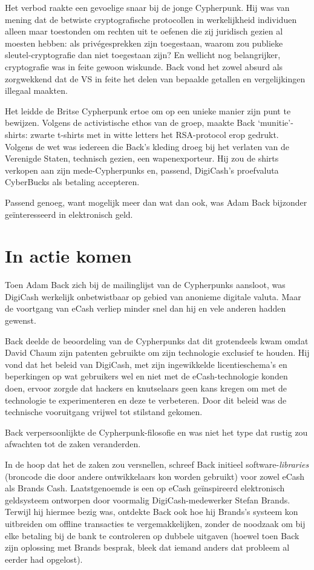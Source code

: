 \documentclass[smalldemyvopaper,11pt,twoside,onecolumn,openright,extrafontsizes,hidelinks]{memoir}
\begin{document}
Het verbod raakte een gevoelige snaar bij de jonge Cypherpunk. Hij was
van mening dat de betwiste cryptografische protocollen in werkelijkheid
individuen alleen maar toestonden om rechten uit te oefenen die zij
juridisch gezien al moesten hebben: als privégesprekken zijn toegestaan,
waarom zou publieke sleutel-cryptografie dan niet toegestaan zijn? En
wellicht nog belangrijker, cryptografie was in feite gewoon wiskunde.
Back vond het zowel absurd als zorgwekkend dat de VS in feite het delen
van bepaalde getallen en vergelijkingen illegaal maakten.

Het leidde de Britse Cypherpunk ertoe om op een unieke manier zijn punt
te bewijzen. Volgens de activistische ethos van de groep, maakte Back
`munitie'-shirts: zwarte t-shirts met in witte letters het RSA-protocol
erop gedrukt. Volgens de wet was iedereen die Back's kleding droeg bij
het verlaten van de Verenigde Staten, technisch gezien, een
wapenexporteur. Hij zou de shirts verkopen aan zijn mede-Cypherpunks en,
passend, DigiCash's proefvaluta CyberBucks als betaling accepteren.

Passend genoeg, want mogelijk meer dan wat dan ook, was Adam Back
bijzonder geïnteresseerd in elektronisch geld.

\section{In actie komen}\label{in-actie-komen}

Toen Adam Back zich bij de mailinglijst van de Cypherpunks aansloot, was
DigiCash werkelijk onbetwistbaar op gebied van anonieme digitale valuta.
Maar de voortgang van eCash verliep minder snel dan hij en vele anderen
hadden gewenst.

Back deelde de beoordeling van de Cypherpunks dat dit grotendeels kwam
omdat David Chaum zijn patenten gebruikte om zijn technologie exclusief
te houden. Hij vond dat het beleid van DigiCash, met zijn ingewikkelde
licentieschema's en beperkingen op wat gebruikers wel en niet met de
eCash-technologie konden doen, ervoor zorgde dat hackers en knutselaars
geen kans kregen om met de technologie te experimenteren en deze te
verbeteren. Door dit beleid was de technische vooruitgang vrijwel tot
stilstand gekomen.

Back verpersoonlijkte de Cypherpunk-filosofie en was niet het type dat
rustig zou afwachten tot de zaken veranderden.

In de hoop dat het de zaken zou versnellen, schreef Back initieel
software-\emph{libraries} (broncode die door andere ontwikkelaars kon
worden gebruikt) voor zowel eCash als Brands Cash. Laatstgenoemde is een
op eCash geïnspireerd elektronisch geldsysteem ontworpen door voormalig
DigiCash-medewerker Stefan Brands. Terwijl hij hiermee bezig was,
ontdekte Back ook hoe hij Brands's systeem kon uitbreiden om offline
transacties te vergemakkelijken, zonder de noodzaak om bij elke betaling
bij de bank te controleren op dubbele uitgaven (hoewel toen Back zijn
oplossing met Brands besprak, bleek dat iemand anders dat probleem al
eerder had opgelost).
\end{document}
